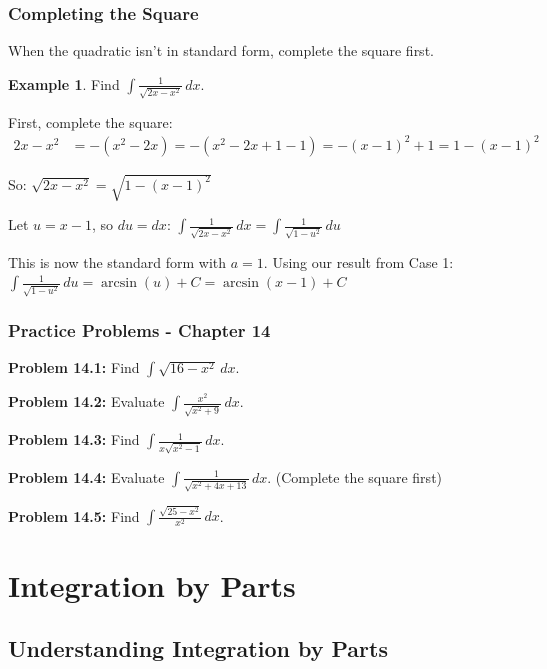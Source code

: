 \documentclass[12pt,a4paper]{book}
\theoremstyle{definition}
\newtheorem{example}{Example}[chapter]
\begin{document}
\subsection{Completing the Square}

When the quadratic isn't in standard form, complete the square first.

\begin{example}
Find $\int \frac{1}{\sqrt{2x - x^2}} \, dx$.

First, complete the square:
\begin{align}
2x - x^2 &= -(x^2 - 2x) = -(x^2 - 2x + 1 - 1) = -(x-1)^2 + 1 = 1 - (x-1)^2
\end{align}

So: $\sqrt{2x - x^2} = \sqrt{1 - (x-1)^2}$

Let $u = x - 1$, so $du = dx$:
$\int \frac{1}{\sqrt{2x - x^2}} \, dx = \int \frac{1}{\sqrt{1 - u^2}} \, du$

This is now the standard form with $a = 1$. Using our result from Case 1:
$\int \frac{1}{\sqrt{1 - u^2}} \, du = \arcsin(u) + C = \arcsin(x-1) + C$
\end{example}

\subsection{Practice Problems - Chapter 14}

\textbf{Problem 14.1:} Find $\int \sqrt{16 - x^2} \, dx$.

\textbf{Problem 14.2:} Evaluate $\int \frac{x^2}{\sqrt{x^2 + 9}} \, dx$.

\textbf{Problem 14.3:} Find $\int \frac{1}{x\sqrt{x^2 - 1}} \, dx$.

\textbf{Problem 14.4:} Evaluate $\int \frac{1}{\sqrt{x^2 + 4x + 13}} \, dx$. (Complete the square first)

\textbf{Problem 14.5:} Find $\int \frac{\sqrt{25 - x^2}}{x^2} \, dx$.

\chapter{Integration by Parts}

\section{Understanding Integration by Parts}
\end{document}

